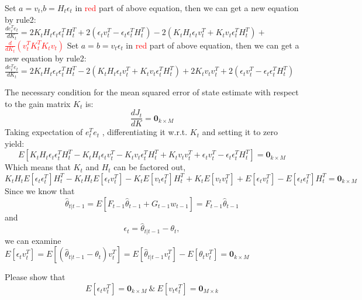 \documentclass[a4 paper]{article}
\begin{document}
\begin{tcolorbox}[colback=YellowGreen!5!white,colframe=YellowGreen!75!black,title={Problem 2's answer}]
    Set $a=v_t$,$b=H_t\epsilon_t$ in \textcolor{red}{red} part of above equation, then we can get a new equation by rule2:\newline
    $\frac{de_t^Te_t}{dK_t}=2K_tH_t\epsilon_t\epsilon_t^TH_t^T+2(\epsilon_tv_t^T-\epsilon_t\epsilon_t^TH_t^T)-2(K_tH_t\epsilon_tv_t^T+K_tv_t\epsilon_t^TH_t^T)+$\textcolor{red}{$\frac{d}{dK_t}(v_t^TK_t^TK_tv_t)$}\newline
    Set $a=b=v_t\epsilon_t$ in \textcolor{red}{red} part of above equation, then we can get a new equation by rule2:\newline
    $\frac{de_t^Te_t}{dK_t}=2K_tH_t\epsilon_t\epsilon_t^TH_t^T-2(K_tH_t\epsilon_tv_t^T+K_tv_t\epsilon_t^TH^T_t)+2K_tv_tv_t^T+2(\epsilon_tv^T_t- \epsilon_t\epsilon_t^TH^T_t)$
\end{tcolorbox}
The necessary condition for the mean squared error of state estimate with respect to the gain matrix $K_t$ is:
$$\frac{dJ_t}{dK}=\textbf{0}_{k\times M}$$
Taking expectation of $e_t^Te_t$ , differentiating it w.r.t. $K_t$ and setting it to zero yield:
\begin{equation}
    E[K_tH_t\epsilon_t\epsilon_t^TH_t^T -K_tH_t\epsilon_{t}v_t^T - K_tv_t\epsilon_t^TH^T_t + K_tv_tv_t^T + \epsilon_tv^T_t- \epsilon_t\epsilon_t^TH^T_t]=\textbf{0}_{k\times M}
\end{equation}
Which means that $K_t$ and $H_t$ can be factored out, 
\begin{equation}
    K_tH_tE[\epsilon_t\epsilon_t^T]H^T_t-K_tH_tE[\epsilon_tv^T_t ] - K_tE [ v_t\epsilon_t^T]H^T_t + K_tE[ v_tv^T_t ] + E[\epsilon_tv^T_t]-E[\epsilon_t\epsilon_t^T ]H^T_t = \textbf{0}_{k\times M}
\end{equation}
Since we know that 
\begin{equation}
    \hat{\theta}_{t|t-1} = E[F_{t-1}\hat{\theta}_{t-1}+ G_{t-1}w_{t -1}]=F_{t-1}\hat{\theta}_{t-1}
\end{equation}
and $$\epsilon_t=\hat{\theta}_{t|t-1}-\theta_t,$$
we can examine $E[\epsilon_tv_t^T]=E[(\hat{\theta}_{t|t-1}-\theta_t)v_t^T]=E[\hat{\theta}_{t|t-1}v_t^T]-E[\theta_tv_t^T]=\textbf{0}_{k\times M}$
\begin{tcolorbox}[colback=RubineRed!5!white,colframe=RubineRed!75!black]
Please show that 
\begin{equation}
    E[\epsilon_tv_t^T]=\textbf{0}_{k\times M} \ \& \ E[v_t\epsilon_t^T]=\textbf{0}_{M\times k}
\end{equation}
\end{tcolorbox}
\end{document}
